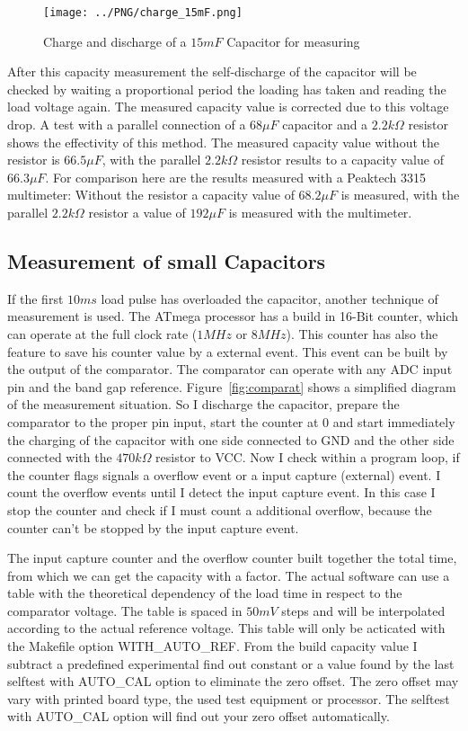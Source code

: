 \begin{figure}[H]
  \centering
    \texttt{[image: ../PNG/charge\_15mF.png]}
  \caption{Charge and discharge of a \(15mF\) Capacitor for measuring}
  \label{pic:c15mF}
\end{figure}

After this capacity measurement the self-discharge of the capacitor will be checked by
waiting a proportional period the loading has taken and reading the load voltage again.
The measured capacity value is corrected due to this voltage drop.
A test with a parallel connection of a \(68\mu F\) capacitor and a \(2.2k\Omega\) resistor shows
the effectivity of this method.
The measured capacity value without the resistor is \(66.5\mu F\),
with the parallel \(2.2k\Omega\) resistor results to a capacity value of \(66.3\mu F\).
For comparison here are the results measured with a Peaktech 3315 multimeter:
Without the resistor a capacity value of \(68.2\mu F\) is measured, with the
parallel \(2.2k\Omega\) resistor a value of \(192\mu F\) is measured with the multimeter.


\subsection{Measurement of small Capacitors}
If the first \(10ms\) load pulse has overloaded the capacitor, another technique of measurement is used.
The ATmega processor has a build in 16-Bit counter, which can operate at the full clock rate (\(1MHz\) or \(8MHz\)).
This counter has also the feature to save his counter value by a external event.
This event can be built by the output of the comparator. 
The comparator can operate with any ADC input pin and the band gap reference.
Figure~\ref{fig:comparat} shows a simplified diagram of the measurement situation.
So I discharge the capacitor, prepare the comparator to the proper pin input, start the counter at 0 and
start immediately the charging of the capacitor with one side connected to GND and the other side connected with
the \(470k\Omega\) resistor to VCC.
Now I check within a program loop, if the counter flags signals a overflow event or a input capture (external) event.
I count the overflow events until I detect the input capture event.
In this case I stop the counter and check if I must count a additional overflow,
because the counter can't be stopped by the input capture event.


The input capture counter and the overflow counter built together the total time,
from which we can get the capacity with a factor.
The actual software can use a table with the theoretical  dependency of the load time in respect to the comparator voltage.
The table is spaced in \(50mV\) steps and will be interpolated according to the actual reference voltage. 
This table will only be acticated with the Makefile option WITH\_AUTO\_REF.
From the build capacity value I subtract a predefined experimental find out constant or a value found by the last selftest
with AUTO\_CAL option to eliminate the zero offset. 
The zero offset may vary with printed board type, the used test equipment or processor.
The selftest with AUTO\_CAL option will find out your zero offset automatically.

